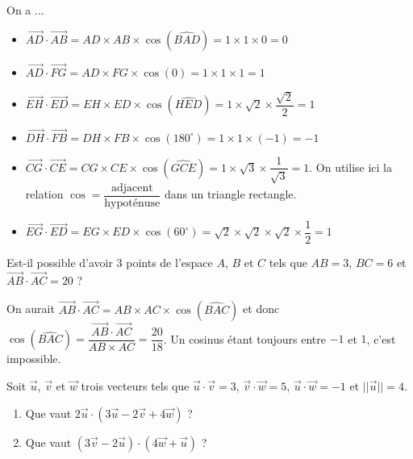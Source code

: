 \documentclass[11pt,fleqn, openany]{book} %
\begin{document}
\begin{solution}On a ...
\begin{itemize}
\item $\overrightarrow{AD} \cdot \overrightarrow{AB} = AD \times AB \times \cos (\widehat{BAD})=1 \times 1 \times 0 = 0$
\item $\overrightarrow{AD} \cdot \overrightarrow{FG} = AD \times FG \times \cos(0)=1 \times 1 \times 1 = 1$ 
\item $\overrightarrow{EH} \cdot \overrightarrow{ED} = EH \times ED \times \cos(\widehat{HED})=1 \times \sqrt{2} \times \dfrac{\sqrt{2}}{2}=1$ 
\item $\overrightarrow{DH} \cdot \overrightarrow{FB} = DH \times FB \times \cos (180^{\circ})=1 \times 1 \times (-1) = -1$
\item $\overrightarrow{CG} \cdot \overrightarrow{CE} = CG \times CE \times \cos(\widehat{GCE})=1 \times \sqrt{3} \times \dfrac{1}{\sqrt{3}}=1$. On utilise ici la relation $\cos = \dfrac{\text{adjacent}}{\text{hypoténuse}}$ dans un triangle rectangle.
\item $\overrightarrow{EG} \cdot \overrightarrow{ED} = EG \times ED \times \cos(60^{\circ})=\sqrt{2} \times \sqrt{2} \times \sqrt{2} \times \dfrac{1}{2} = 1$

\end{itemize}\end{solution}




\begin{exercise}[topic=geom11]Est-il possible d'avoir 3 points de l'espace $A$, $B$ et $C$ tels que $AB=3$, $BC=6$ et $\overrightarrow{AB} \cdot \overrightarrow{AC} = 20$ ?\end{exercise}

\begin{solution}On aurait $\overrightarrow{AB}\cdot \overrightarrow{AC}=AB \times AC \times \cos(\widehat{BAC})$ et donc $\cos(\widehat{BAC})=\dfrac{\overrightarrow{AB}\cdot\overrightarrow{AC}}{AB \times AC}=\dfrac{20}{18}$. Un cosinus étant toujours entre $-1$ et $1$, c'est impossible.\end{solution}





\begin{exercise}[topic=geom11]Soit $\vec u$, $\vec v$ et $\vec w$ trois vecteurs tels que $\vec u \cdot \vec v = 3$, $\vec v \cdot \vec w=5$, $\vec u \cdot \vec w = -1$ et $\lvert \lvert \vec u \rvert \rvert=4$. 
\begin{enumerate}
\item Que vaut $ 2\vec u \cdot (3 \vec u - 2 \vec v + 4\vec w)$ ?
\item Que vaut $(3\vec v - 2 \vec u) \cdot (4\vec w + \vec u)$ ?
\end{enumerate}\end{exercise}
\end{document}
